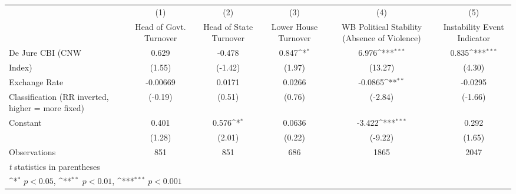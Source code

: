 {
\def\sym#1{\ifmmode^{#1}\else\(^{#1}\)\fi}
\begin{tabular}{l*{5}{c}}
\toprule
                &\multicolumn{1}{c}{(1)}&\multicolumn{1}{c}{(2)}&\multicolumn{1}{c}{(3)}&\multicolumn{1}{c}{(4)}&\multicolumn{1}{c}{(5)}\\
                &\multicolumn{1}{c}{Head of Govt. Turnover}&\multicolumn{1}{c}{Head of State Turnover}&\multicolumn{1}{c}{Lower House Turnover}&\multicolumn{1}{c}{WB Political Stability (Absence of Violence)}&\multicolumn{1}{c}{Instability Event Indicator}\\
\midrule
De Jure CBI (CNW&    0.629         &   -0.478         &    0.847\sym{*}  &    6.976\sym{***}&    0.835\sym{***}\\
Index)          &   (1.55)         &  (-1.42)         &   (1.97)         &  (13.27)         &   (4.30)         \\
\addlinespace
Exchange Rate   & -0.00669         &   0.0171         &   0.0266         &  -0.0865\sym{**} &  -0.0295         \\
Classification (RR inverted, higher = more fixed)&  (-0.19)         &   (0.51)         &   (0.76)         &  (-2.84)         &  (-1.66)         \\
\addlinespace
Constant        &    0.401         &    0.576\sym{*}  &   0.0636         &   -3.422\sym{***}&    0.292         \\
                &   (1.28)         &   (2.01)         &   (0.22)         &  (-9.22)         &   (1.65)         \\
\midrule
Observations    &      851         &      851         &      686         &     1865         &     2047         \\
\bottomrule
\multicolumn{6}{l}{\footnotesize \textit{t} statistics in parentheses}\\
\multicolumn{6}{l}{\footnotesize \sym{*} \(p<0.05\), \sym{**} \(p<0.01\), \sym{***} \(p<0.001\)}\\
\end{tabular}
}
